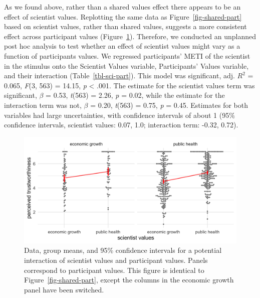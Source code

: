 \documentclass[
  letterpaper,
  DIV=11,
  numbers=noendperiod]{scrartcl}
\begin{document}
As we found above, rather than a shared values effect there appears to
be an effect of scientist values. Replotting the same data as
Figure~\ref{fig-shared-part} based on scientist values, rather than
shared values, suggests a more consistent effect across participant
values (Figure~\ref{fig-sci-part}). Therefore, we conducted an unplanned
post hoc analysis to test whether an effect of scientist values might
vary as a function of participants values. We regressed participants'
METI of the scientist in the stimulus onto the Scientist Values
variable, Participants' Values variable, and their interaction
(Table~\ref{tbl-sci-part}). This model was significant, adj. \(R^2\) =
0.065, \emph{F}(3, 563) = 14.15, \emph{p} \textless{} .001. The estimate
for the scientist values term was significant, \(\beta\) = 0.53,
\emph{t}(563) = 2.26, \emph{p} = 0.02, while the estimate for the
interaction term was not, \(\beta\) = 0.20, \emph{t}(563) = 0.75,
\emph{p} = 0.45. Estimates for both variables had large uncertainties,
with confidence intervals of about 1 (95\% confidence intervals,
scientist values: 0.07, 1.0; interaction term: -0.32, 0.72).

\begin{figure}

{\centering \includegraphics{fig6_sci_part.png}

}

\caption{\label{fig-sci-part}Data, group means, and 95\% confidence
intervals for a potential interaction of scientist values and
participant values. Panels correspond to participant values. This figure
is identical to Figure~\ref{fig-shared-part}, except the columns in the
economic growth panel have been switched.}

\end{figure}
\end{document}
